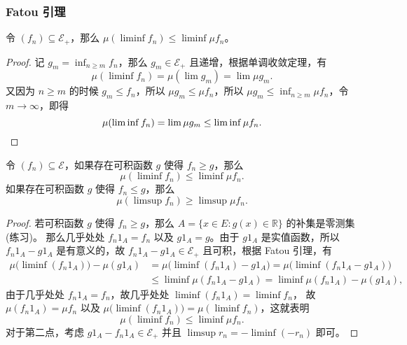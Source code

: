 \documentclass[fontset=none]{Notes}
\begin{document}
\subsubsection{Fatou 引理}

\begin{lemma}
  令 $(f_n)\subseteq \mathcal{E}_+$，那么 $\mu(\liminf f_n)\leq \liminf\mu f_n$。
\end{lemma}
\begin{proof}
  记 $g_m=\inf_{n\geq m}f_n$，那么 $g_m\in \mathcal{E}_+$ 且递增，根据单调收敛定理，有
  \[
    \mu(\liminf f_n)=\mu(\lim g_m)=\lim\mu g_m.
  \]
  又因为 $n\geq m$ 的时候 $g_m\leq f_n$，所以 $\mu g_m\leq \mu f_n$，所以
  $\mu g_m\leq \inf_{n\geq m} \mu f_n$，令 $m\to\infty$，即得
  \[
    \mu(\liminf f_n)=\lim\mu g_m\leq \liminf \mu f_n.\qedhere
  \]
\end{proof}

\begin{corollary}
  令 $(f_n)\subseteq \mathcal{E}$，如果存在可积函数 $g$ 使得 $f_n\geq g$，那么
  \[
    \mu(\liminf f_n)\leq\liminf \mu f_n.
  \]
  如果存在可积函数 $g$ 使得 $f_n\leq g$，那么
  \[
    \mu(\limsup f_n)\geq \limsup \mu f_n.
  \]
\end{corollary}
\begin{proof}
  若可积函数 $g$ 使得 $f_n\geq g$，那么 $A=\{x\in E:g(x)\in \mathbb{R}\}$ 的补集是零测集(练习)。
  那么几乎处处 $f_n1_A=f_n$ 以及 $g1_A=g$。由于 $g1_A$ 是实值函数，所以
  $f_n1_A-g1_A$ 是有意义的，故 $f_n1_A-g1_A\in \mathcal{E}_+$ 且可积，根据 Fatou 引理，有
  \begin{align*}
    \mu\bigl(\liminf (f_n1_A)\bigr)-\mu(g1_A)&=\mu\bigl(\liminf (f_n1_A)- g1_A\bigr)
    =\mu\bigl(\liminf (f_n1_A-g1_A)\bigr)\\
    &\leq \liminf\mu(f_n1_A-g1_A)=\liminf \mu(f_n1_A)-\mu(g1_A),
  \end{align*}
  由于几乎处处 $f_n1_A=f_n$，故几乎处处 $\liminf (f_n1_A)=\liminf f_n$，
  故 $\mu(f_n1_A)=\mu f_n$ 以及 $\mu\bigl(\liminf (f_n1_A)\bigr)=\mu(\liminf f_n)$，这就表明
  \[
    \mu(\liminf f_n)\leq\liminf \mu f_n.
  \]
  对于第二点，考虑 $g1_A-f_n1_A\in \mathcal{E}_+$ 并且 $\limsup r_n=-\liminf(-r_n)$ 即可。
\end{proof}
\end{document}
